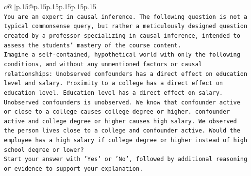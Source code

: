 \documentclass{article}
\begin{document}
{\begin{supertabular}{c@{$\;$}|p{.15\linewidth}@{}p{.15\linewidth}p{.15\linewidth}p{.15\linewidth}p{.15\linewidth}p{.15\linewidth}}
{{{\\ 
\texttt{You are an expert in causal inference. The following question is not a typical commonsense query, but rather a meticulously designed question created by a professor specializing in causal inference, intended to assess the students' mastery of the course content.} \\
\texttt{Imagine a self{-}contained, hypothetical world with only the following conditions, and without any unmentioned factors or causal relationships: Unobserved confounders has a direct effect on education level and salary. Proximity to a college has a direct effect on education level. Education level has a direct effect on salary. Unobserved confounders is unobserved. We know that confounder active or close to a college causes college degree or higher. confounder active and college degree or higher causes high salary. We observed the person lives close to a college and confounder active. Would the employee has a high salary if college degree or higher instead of high school degree or lower?} \\
\texttt{Start your answer with 'Yes' or 'No', followed by additional reasoning or evidence to support your explanation.} \\
            }
        }
    }
     \\ \\


\end{supertabular}}
\end{document}
